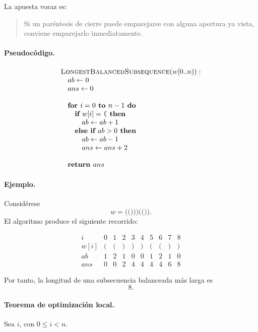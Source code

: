 \documentclass[11pt]{article}
\begin{document}
La apuesta voraz es:

\begin{quote}
Si un paréntesis de cierre puede emparejarse con alguna apertura ya vista, conviene
emparejarlo inmediatamente.
\end{quote}

\paragraph{Pseudocódigo.}
\[
\begin{array}{l}
\textsc{LongestBalancedSubsequence}(w[0..n)):\\
\quad ab \gets 0 \\
\quad ans \gets 0 \\
\\
\quad \textbf{for } i = 0 \textbf{ to } n-1 \textbf{ do}\\
\quad \quad \textbf{if } w[i] = \texttt{(} \textbf{ then}\\
\quad \quad \quad ab \gets ab + 1\\
\quad \quad \textbf{else if } ab > 0 \textbf{ then}\\
\quad \quad \quad ab \gets ab - 1\\
\quad \quad \quad ans \gets ans + 2\\
\\
\quad \textbf{return } ans
\end{array}
\]

\paragraph{Ejemplo.}
Considérese
\[
w=\texttt{(()))(())}.
\]
El algoritmo produce el siguiente recorrido:

\[
\begin{array}{c|ccccccccc}
i & 0 & 1 & 2 & 3 & 4 & 5 & 6 & 7 & 8\\
\hline
w[i] & \texttt{(} & \texttt{(} & \texttt{)} & \texttt{)} & \texttt{)} & \texttt{(} & \texttt{(} & \texttt{)} & \texttt{)}\\
ab & 1 & 2 & 1 & 0 & 0 & 1 & 2 & 1 & 0\\
ans & 0 & 0 & 2 & 4 & 4 & 4 & 4 & 6 & 8
\end{array}
\]

Por tanto, la longitud de una subsecuencia balanceada más larga es
\[
8.
\]

\paragraph{Teorema de optimización local.}
Sea \(i\), con \(0\leq i<n\).
\end{document}
